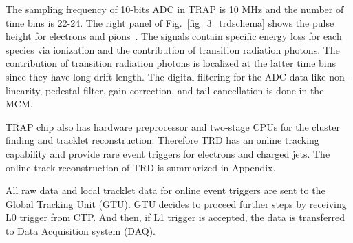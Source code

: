 The sampling frequency of 10-bits ADC in TRAP is 10 MHz and the number of time bins is 22-24.
The right panel of Fig.~\ref{fig_3_trdschema} shows the pulse height for electrons and pions~\cite{bib_trdtdr}. 
The signals contain specific energy loss for each species via ionization and the contribution of transition radiation photons. 
The contribution of transition radiation photons is localized at the latter time bins since they have long drift length. 
The digital filtering for the ADC data like non-linearity, pedestal filter, gain correction, and tail cancellation is done in the MCM.


TRAP chip also has hardware preprocessor and two-stage CPUs for the cluster finding and tracklet reconstruction. 
Therefore TRD has an online tracking capability and provide rare event triggers for electrons and charged jets.
The online track reconstruction of TRD is summarized in Appendix. 

All raw data and local tracklet data for online event triggers are sent to the Global Tracking Unit (GTU). 
GTU decides to proceed further steps by receiving L0 trigger from CTP. 
And then, if L1 trigger is accepted, the data is transferred to Data Acquisition system (DAQ).

